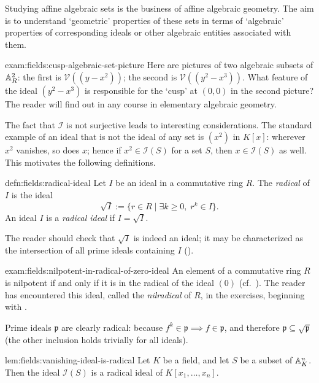 Studying affine algebraic sets is the business of affine algebraic
geometry. The aim is to understand `geometric' properties of these
sets in terms of `algebraic' properties of corresponding ideals or
other algebraic entities associated with them.
\begin{exam}{}{exam:fields:cusp-algebraic-set-picture}
  Here are pictures of two algebraic subsets of $\mathbb{A}^2_{R}$: the first
  is $\mathcal{V}((y - x^2))$; the second is
  $\mathcal{V}((y^2 - x^3))$. What feature of the ideal $(y^2 - x^3)$
  is responsible for the `cusp' at $(0, 0)$ in the second picture? The
  reader will find out in any course in elementary algebraic geometry.
\end{exam}
The fact that $\mathcal{I}$ is not surjective leads to interesting
considerations. The standard example of an ideal that is not the ideal
of any set is $(x^2)$ in $K[x]$: wherever $x^2$ vanishes, so does $x$;
hence if $x^2 \in \mathcal{I}(S)$ for a set $S$, then
$x \in \mathcal{I}(S)$ as well. This motivates the following
definitions.
\begin{defn}{}{defn:fields:radical-ideal}
  Let $I$ be an ideal in a commutative ring $R$. The \emph{radical} of
  $I$ is the ideal
  \[
    \sqrt{I} := \{r \in R \mid \exists k \geq 0,\; r^k \in I\}.
  \]
  An ideal $I$ is a \emph{radical ideal} if $I = \sqrt{I}$.
\end{defn}
The reader should check that $\sqrt{I}$ is indeed an ideal; it may be
characterized as the intersection of all prime ideals containing $I$
().
\begin{exam}{}{exam:fields:nilpotent-in-radical-of-zero-ideal}
  An element of a commutative ring $R$ is nilpotent if and only if it
  is in the radical of the ideal $(0)$ (cf.\
  ). The reader has
  encountered this ideal, called the \emph{nilradical} of $R$, in the
  exercises, beginning with \Cref{exer:rings:nilpotents-form-ideal}.

  Prime ideals $\mathfrak{p}$ are clearly radical: because
  $f^k \in \mathfrak{p} \implies f \in \mathfrak{p}$, and therefore
  $\mathfrak{p} \subseteq \sqrt{\mathfrak{p}}$ (the other inclusion
  holds trivially for all ideals).
\end{exam}
\begin{lem}{}{lem:fields:vanishing-ideal-is-radical}
  Let $K$ be a field, and let $S$ be a subset of $\mathbb{A}^n_K$. Then the
  ideal $\mathcal{I}(S)$ is a radical ideal of $K[x_1, \dots, x_n]$.
\end{lem}
